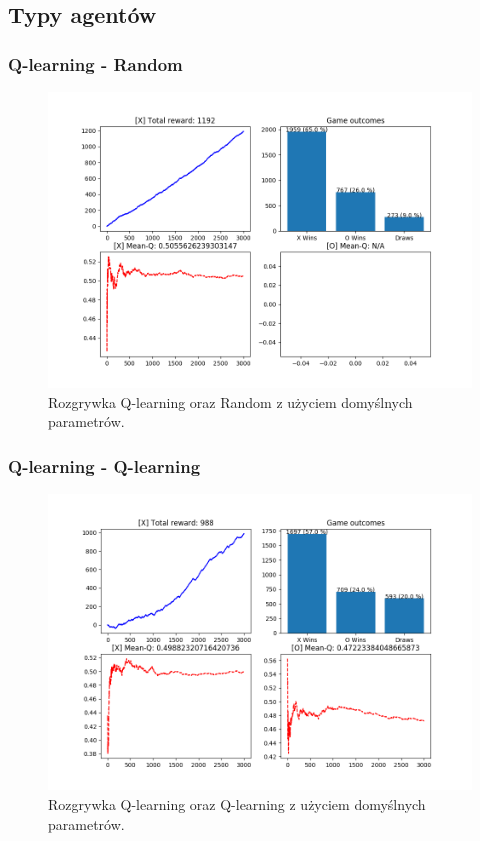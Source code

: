 \subsection{Typy agentów}

\subsubsection{Q-learning - Random}

\begin{figure}[H]
	\centering
	\includegraphics[width=0.7\linewidth]{imgs/q_learning/vs/q-r}
	\caption{Rozgrywka Q-learning oraz Random z użyciem domyślnych parametrów.}
\end{figure}

\subsubsection{Q-learning - Q-learning}

\begin{figure}[H]
	\centering
	\includegraphics[width=0.7\linewidth]{imgs/q_learning/vs/q-q}
	\caption{Rozgrywka Q-learning oraz Q-learning z użyciem domyślnych parametrów.}
\end{figure}

\pagebreak